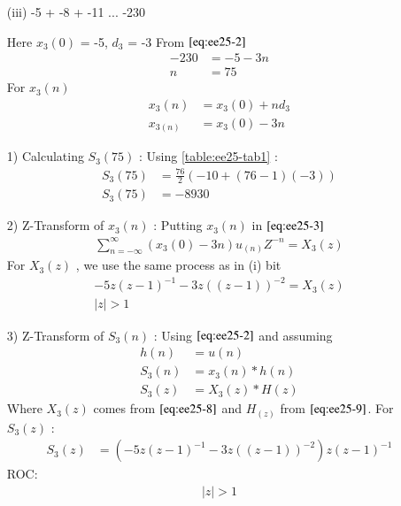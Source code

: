 \documentclass[journal,12pt,twocolumn]{IEEEtran}
\theoremstyle{remark}
\begin{document}
\begin{enumerate}
\vspace{1.5cm} 
\item[(iii)]
-5 + -8 + -11 ... -230
\vspace{0.2cm}

Here $x_3(0)$ = -5, $d_3$ = -3\vspace{0.05cm}
From $\eqref{eq:ee25-2}$
\begin{align}
-230 &= -5 -3n \\
n &= 75
\end{align}
For $x_3(n)$
\begin{align}
x_3(n) &= x_3(0) + nd_3\\
x_{3(n)} &= x_3(0) - 3n
\end{align}


\item[1)]
Calculating $S_3(75)$ :
Using \ref{table:ee25-tab1} :\vspace{0.05cm}
\begin{align}
    S_3(75) &= \frac{76}{2}(-10+(76-1)(-3))\\
   S_3(75) &= -8930
    \end{align}

\item[2)] 
Z-Transform of $x_3(n)$ :
Putting $x_3(n)$ in $\eqref{eq:ee25-3}$
\vspace{0.05cm}
\begin{align}
\sum_{n=-\infty}^{\infty}(x_3(0) -3n)u_{(n)}Z^{-n} =X_3(z)
\end{align}
For $X_3(z)$ , we use the same process as in (i) bit\vspace{0.05cm}
\begin{align}
 -5z(z-1)^{-1}-
       3z((z-1))^{-2}=X_3(z) \label{eq:ee25-8}\\
           \lvert z\rvert  >  1 
\end{align}

    \vspace{0.7cm}
\item[3)]
Z-Transform of $S_3(n)$ :
Using $\eqref{eq:ee25-2}$ and assuming 
\begin{align}
         h(n) &= u(n) \\
    S_3(n) &= x_3(n) * h(n) \\
    S_3(z) &= X_3(z) * H(z)
    \end{align}
    Where $X_3(z)$ comes from $\eqref{eq:ee25-8}$ and $H_(z)$ from $\eqref{eq:ee25-9}$.
    \vspace{0.05cm}
    For $S_3(z)$ :
    \begin{align}
            S_3(z) &= (-5z(z-1)^{-1}-
       3z((z-1))^{-2})z(z-1)^{-1}
    \end{align}
    ROC:
    \begin{align} 
    \lvert z \rvert > 1
    \end{align}
    

\end{enumerate}
\end{document}
